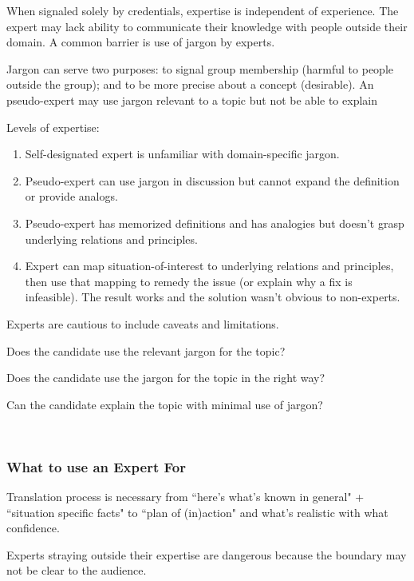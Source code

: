 When signaled solely by credentials, expertise is independent of experience. The expert may lack ability to communicate their knowledge with people outside their domain. A common barrier is use of jargon by experts.

Jargon can serve two purposes: to signal group membership (harmful to people outside the group); and to be more precise about a concept (desirable). An pseudo-expert may use jargon relevant to a topic but not be able to explain

Levels of expertise:
\begin{enumerate}
    \item Self-designated expert is unfamiliar with domain-specific jargon.
    \item Pseudo-expert can use jargon in discussion but cannot expand the definition or provide analogs.
    \item Pseudo-expert has memorized definitions and has analogies but doesn't grasp underlying relations and principles.
    \item Expert can map situation-of-interest to underlying relations and principles, then use that mapping to remedy the issue (or explain why a fix is infeasible). The result works and the solution wasn't obvious to non-experts.
\end{enumerate}


Experts are cautious to include caveats and limitations.

Does the candidate use the relevant jargon for the topic?

Does the candidate use the jargon for the topic in the right way?
    
Can the candidate explain the topic with minimal use of jargon?

\ \\

\subsubsection*{What to use an Expert For}

Translation process is necessary from ``here's what's known in general" + ``situation specific facts" to ``plan of (in)action" and what's realistic with what confidence. 

Experts straying outside their expertise are dangerous because the boundary may not be clear to the audience.


